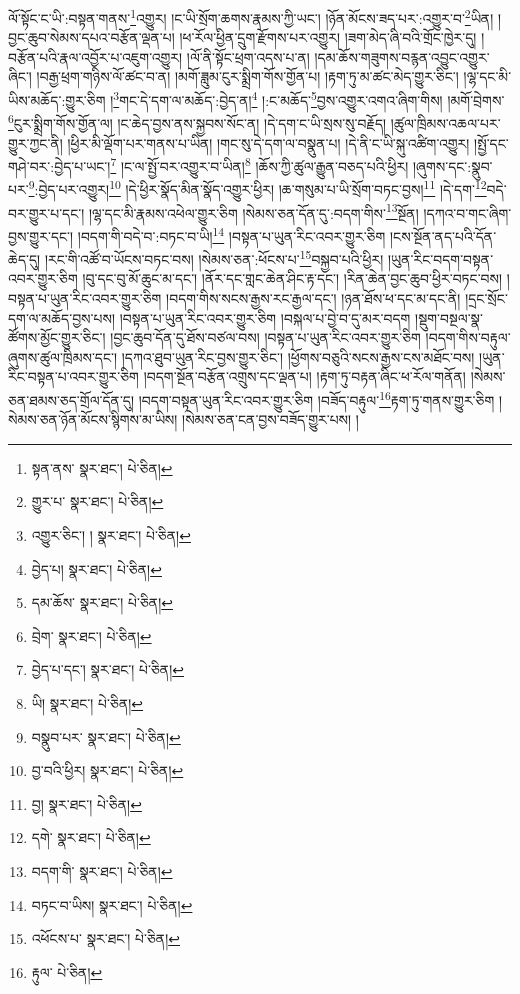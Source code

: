 ལོ་སྟོང་ང་ཡི་:བསྟན་གནས་\footnote{སྟན་ནས་  སྣར་ཐང་།  པེ་ཅིན། }འགྱུར། །ང་ཡི་སྲོག་ཆགས་རྣམས་ཀྱི་ཡང་། །ཉོན་མོངས་ཟད་པར་:འགྱུར་བ་\footnote{གྱུར་པ་  སྣར་ཐང་།  པེ་ཅིན། }ཡིན། །བྱང་ཆུབ་སེམས་དཔའ་བརྩོན་ལྡན་པ། །ཕ་རོལ་ཕྱིན་དྲུག་རྫོགས་པར་འགྱུར། །ཟག་མེད་ཞི་བའི་གྲོང་ཁྱེར་དུ། །བརྩོན་པའི་རྣལ་འབྱོར་པ་འཇུག་འགྱུར། །ལོ་ནི་སྟོང་ཕྲག་འདས་པ་ན། །དམ་ཆོས་གཟུགས་བརྙན་འབྱུང་འགྱུར་ཞིང་། །བརྒྱ་ཕྲག་གཉིས་ལོ་ཚང་བ་ན། །མགོ་ཟླུམ་ངུར་སྨྲིག་གོས་གྱོན་པ། །རྟག་ཏུ་མ་ཚང་མེད་གྱུར་ཅིང་། །ལྷ་དང་མི་ཡིས་མཆོད་:གྱུར་ཅིག །\footnote{འགྱུར་ཅིང་། །  སྣར་ཐང་།  པེ་ཅིན། }གང་དེ་དག་ལ་མཆོད་:བྱེད་ན།\footnote{བྱེད་པ།  སྣར་ཐང་།  པེ་ཅིན། } །:ང་མཆོད་\footnote{དམ་ཆོས་  སྣར་ཐང་།  པེ་ཅིན། }བྱས་འགྱུར་འགའ་ཞིག་གིས། །མགོ་བྲེགས་\footnote{བྲེག་  སྣར་ཐང་།  པེ་ཅིན། }ངུར་སྨྲིག་གོས་གྱོན་ལ། །ང་ཆེད་བྱས་ནས་སྐྱབས་སོང་ན། །དེ་དག་ང་ཡི་སྲས་སུ་བརྗོད། །ཚུལ་ཁྲིམས་འཆལ་པར་གྱུར་ཀྱང་ནི། །ཕྱིར་མི་ལྡོག་པར་གནས་པ་ཡིན། །གང་སུ་དེ་དག་ལ་བསྣུན་པ། །དེ་ནི་ང་ཡི་སྐུ་འཚིག་འགྱུར། །སྤྱོ་དང་གཤེ་བར་:བྱེད་པ་ཡང་།\footnote{བྱེད་པ་དང་།  སྣར་ཐང་།  པེ་ཅིན། } །ང་ལ་སྤྱོ་བར་འགྱུར་བ་ཡིན།\footnote{ཡི།  སྣར་ཐང་།  པེ་ཅིན། } །ཆོས་ཀྱི་ཚུལ་རྒྱུན་བཅད་པའི་ཕྱིར། །ཞུགས་དང་:སྣུབ་པར་\footnote{བསྣུབ་པར་  སྣར་ཐང་།  པེ་ཅིན། }:བྱེད་པར་འགྱུར།\footnote{བྱ་བའི་ཕྱིར།  སྣར་ཐང་།  པེ་ཅིན། } །དེ་ཕྱིར་སྣོད་མིན་སྣོད་འགྱུར་ཕྱིར། །ཆ་གསུམ་པ་ཡི་སྲོག་བཏང་བྱས།\footnote{བྱ།  སྣར་ཐང་།  པེ་ཅིན། } །དེ་དག་\footnote{དགེ་  སྣར་ཐང་།  པེ་ཅིན། }བདེ་བར་གྱུར་པ་དང་། །ལྷ་དང་མི་རྣམས་འཕེལ་གྱུར་ཅིག །སེམས་ཅན་དོན་དུ་:བདག་གིས་\footnote{བདག་གི་  སྣར་ཐང་།  པེ་ཅིན། }སྔོན། །དཀའ་བ་གང་ཞིག་བྱས་གྱུར་དང་། །བདག་གི་བདེ་བ་:བཏང་བ་ཡི།\footnote{བཏང་བ་ཡིས།  སྣར་ཐང་།  པེ་ཅིན། } །བསྟན་པ་ཡུན་རིང་འབར་གྱུར་ཅིག །ངས་སྔོན་ནད་པའི་དོན་ཆེད་དུ། །རང་གི་འཚོ་བ་ཡོངས་བཏང་བས། །སེམས་ཅན་:ཕོངས་པ་\footnote{འཕོངས་པ་  སྣར་ཐང་།  པེ་ཅིན། }བསྐྱབ་པའི་ཕྱིར། །ཡུན་རིང་བདག་བསྟན་འབར་གྱུར་ཅིག །བུ་དང་བུ་མོ་ཆུང་མ་དང་། །ནོར་དང་གླང་ཆེན་ཤིང་རྟ་དང་། །རིན་ཆེན་བྱང་ཆུབ་ཕྱིར་བཏང་བས། །བསྟན་པ་ཡུན་རིང་འབར་གྱུར་ཅིག །བདག་གིས་སངས་རྒྱས་རང་རྒྱལ་དང་། །ཉན་ཐོས་ཕ་དང་མ་དང་ནི། །དྲང་སྲོང་དག་ལ་མཆོད་བྱས་པས། །བསྟན་པ་ཡུན་རིང་འབར་གྱུར་ཅིག །བསྐལ་པ་བྱེ་བ་དུ་མར་བདག །སྡུག་བསྔལ་སྣ་ཚོགས་མྱོང་གྱུར་ཅིང་། །བྱང་ཆུབ་དོན་དུ་ཐོས་བཙལ་བས། །བསྟན་པ་ཡུན་རིང་འབར་གྱུར་ཅིག །བདག་གིས་བརྟུལ་ཞུགས་ཚུལ་ཁྲིམས་དང་། །དཀའ་ཐུབ་ཡུན་རིང་བྱས་གྱུར་ཅིང་། །ཕྱོགས་བཅུའི་སངས་རྒྱས་ངས་མཐོང་བས། །ཡུན་རིང་བསྟན་པ་འབར་གྱུར་ཅིག །བདག་སྔོན་བརྩོན་འགྲུས་དང་ལྡན་པ། །རྟག་ཏུ་བརྟན་ཞིང་ཕ་རོལ་གནོན། །སེམས་ཅན་ཐམས་ཅད་གྲོལ་དོན་དུ། །བདག་བསྟན་ཡུན་རིང་འབར་གྱུར་ཅིག །བཟོད་བརྟུལ་\footnote{རྟུལ་  པེ་ཅིན། }རྟག་ཏུ་གནས་གྱུར་ཅིག །སེམས་ཅན་ཉོན་མོངས་སྙིགས་མ་ཡིས། །སེམས་ཅན་ངན་བྱས་བཟོད་གྱུར་པས། །
